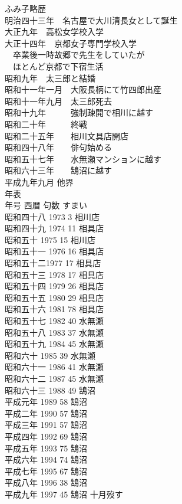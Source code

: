 {\gt ふみ子略歴}
\\明治四十三年　名古屋で大川清長女として誕生
\\大正九年　高松女学校入学
\\大正十四年　京都女子専門学校入学\\
　卒業後一時故郷で先生をしていたが\\
　ほとんど京都で下宿生活
\\昭和九年　太三郎と結婚
\\昭和十一年一月　大阪長柄にて竹四郎出産
\\昭和十一年九月　太三郎死去
\\昭和十九年　　　強制疎開で相川に越す
\\昭和二十年　　　終戦
\\昭和二十五年　　相川文具店開店
\\昭和四十八年　　俳句始める
\\昭和五十七年　　水無瀬マンションに越す
\\昭和六十三年　　鵠沼に越す
\\平成九年九月 他界\\

{\gt 年表}\\
年号 西暦 句数 すまい\\
昭和四十八 1973 3 相川店\\
昭和四十九 1974 11 相具店\\
昭和五十 1975 15 相川店\\
昭和五十一 1976 16 相具店\\
昭和五十二1977 17 相具店\\
昭和五十三 1978 17 相具店\\
昭和五十四 1979 26 相具店\\
昭和五十五 1980 29 相具店\\
昭和五十六 1981 78 相具店\\
昭和五十七 1982 40 水無瀬\\ %
昭和五十八 1983 37 水無瀬\\
昭和五十九 1984 45 水無瀬\\
昭和六十 1985 39 水無瀬\\
昭和六十一 1986 41 水無瀬\\
昭和六十二 1987 45 水無瀬\\
昭和六十三 1988 49 鵠沼\\
平成元年 1989 58 鵠沼\\
平成二年 1990 57 鵠沼\\
平成三年 1991 57 鵠沼\\
平成四年 1992 69 鵠沼\\
平成五年 1993 75 鵠沼\\
平成六年 1994 74 鵠沼\\
平成七年 1995 67 鵠沼\\
平成八年 1996 38 鵠沼\\
平成九年 1997 45 鵠沼 十月歿す \\

